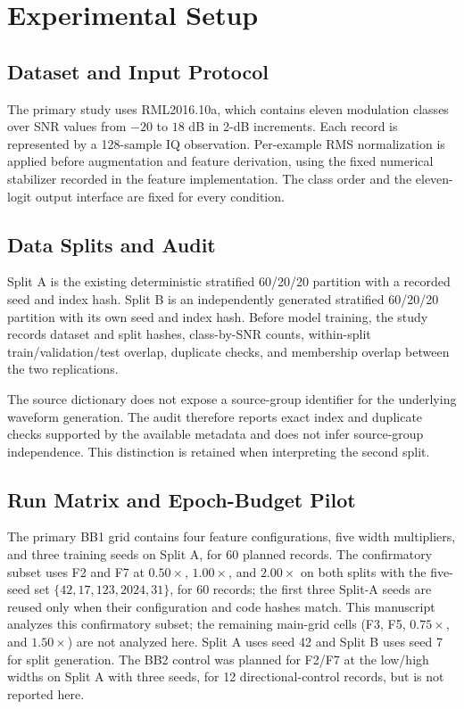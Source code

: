 \section{Experimental Setup}
\label{sec:setup}

\subsection{Dataset and Input Protocol}
The primary study uses RML2016.10a, which contains eleven modulation classes
over SNR values from $-20$ to $18$ dB in 2-dB increments. Each record is
represented by a 128-sample IQ observation. Per-example RMS normalization is
applied before augmentation and feature derivation, using the fixed numerical
stabilizer recorded in the feature implementation. The class order and the
eleven-logit output interface are fixed for every condition.

\subsection{Data Splits and Audit}
Split A is the existing deterministic stratified 60/20/20 partition with a
recorded seed and index hash. Split B is an independently generated
stratified 60/20/20 partition with its own seed and index hash. Before model
training, the study records dataset and split hashes, class-by-SNR counts,
within-split train/validation/test overlap, duplicate checks, and membership
overlap between the two replications.

The source dictionary does not expose a source-group identifier for the
underlying waveform generation. The audit therefore reports exact index and
duplicate checks supported by the available metadata and does not infer
source-group independence. This distinction is retained when interpreting the
second split.

\subsection{Run Matrix and Epoch-Budget Pilot}
The primary BB1 grid contains four feature configurations, five width
multipliers, and three training seeds on Split A, for 60 planned records. The
confirmatory subset uses F2 and F7 at $0.50\times$, $1.00\times$, and
$2.00\times$ on both splits with
the five-seed set $\{42,17,123,2024,31\}$, for 60 records; the first three
Split-A seeds are reused only when their configuration and code hashes match.
This manuscript analyzes this confirmatory subset; the remaining main-grid
cells (F3, F5, $0.75\times$, and $1.50\times$) are not analyzed here.
Split A uses seed 42 and Split B uses seed 7 for split generation. The BB2
control was planned for F2/F7 at the low/high widths on Split A with three
seeds, for 12 directional-control records, but is not reported here.

